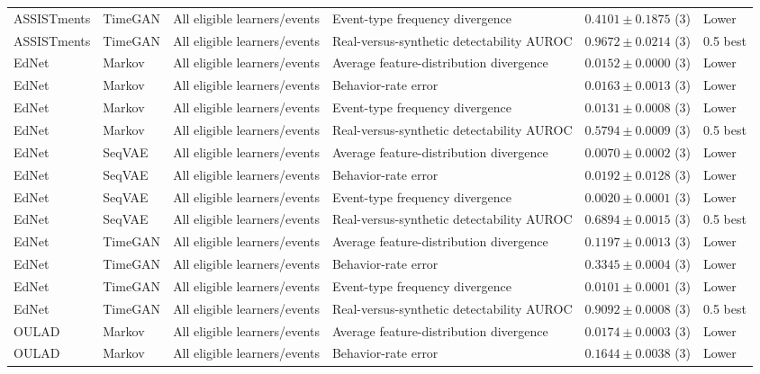 \begin{longtable}{@{}p{2.25cm}p{2.05cm}p{4.7cm}p{5.0cm}p{2.6cm}p{1.25cm}@{}}
ASSISTments & TimeGAN & All eligible learners/events & Event-type frequency divergence & $0.4101 \mathbin{\pm} 0.1875$ (3) & Lower \\
ASSISTments & TimeGAN & All eligible learners/events & Real-versus-synthetic detectability AUROC & $0.9672 \mathbin{\pm} 0.0214$ (3) & 0.5 best \\
EdNet & Markov & All eligible learners/events & Average feature-distribution divergence & $0.0152 \mathbin{\pm} 0.0000$ (3) & Lower \\
EdNet & Markov & All eligible learners/events & Behavior-rate error & $0.0163 \mathbin{\pm} 0.0013$ (3) & Lower \\
EdNet & Markov & All eligible learners/events & Event-type frequency divergence & $0.0131 \mathbin{\pm} 0.0008$ (3) & Lower \\
EdNet & Markov & All eligible learners/events & Real-versus-synthetic detectability AUROC & $0.5794 \mathbin{\pm} 0.0009$ (3) & 0.5 best \\
EdNet & SeqVAE & All eligible learners/events & Average feature-distribution divergence & $0.0070 \mathbin{\pm} 0.0002$ (3) & Lower \\
EdNet & SeqVAE & All eligible learners/events & Behavior-rate error & $0.0192 \mathbin{\pm} 0.0128$ (3) & Lower \\
EdNet & SeqVAE & All eligible learners/events & Event-type frequency divergence & $0.0020 \mathbin{\pm} 0.0001$ (3) & Lower \\
EdNet & SeqVAE & All eligible learners/events & Real-versus-synthetic detectability AUROC & $0.6894 \mathbin{\pm} 0.0015$ (3) & 0.5 best \\
EdNet & TimeGAN & All eligible learners/events & Average feature-distribution divergence & $0.1197 \mathbin{\pm} 0.0013$ (3) & Lower \\
EdNet & TimeGAN & All eligible learners/events & Behavior-rate error & $0.3345 \mathbin{\pm} 0.0004$ (3) & Lower \\
EdNet & TimeGAN & All eligible learners/events & Event-type frequency divergence & $0.0101 \mathbin{\pm} 0.0001$ (3) & Lower \\
EdNet & TimeGAN & All eligible learners/events & Real-versus-synthetic detectability AUROC & $0.9092 \mathbin{\pm} 0.0008$ (3) & 0.5 best \\
OULAD & Markov & All eligible learners/events & Average feature-distribution divergence & $0.0174 \mathbin{\pm} 0.0003$ (3) & Lower \\
OULAD & Markov & All eligible learners/events & Behavior-rate error & $0.1644 \mathbin{\pm} 0.0038$ (3) & Lower \\

\end{longtable}
